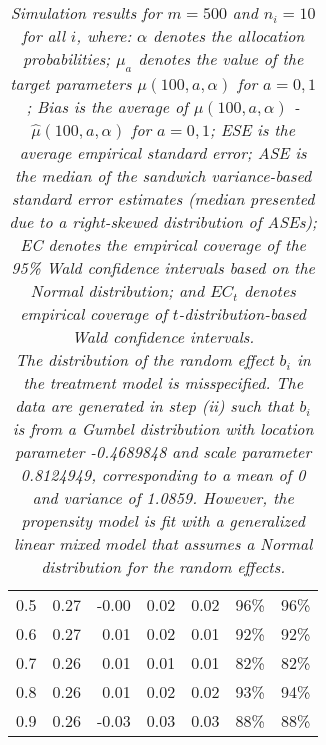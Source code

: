 \documentclass[12pt, letterpaper]{article}
\begin{document}
\begin{table}[ht!]
\begin{tabular}{rrrrrll}
  0.5 & 0.27 & -0.00 & 0.02 & 0.02 & 96\% & 96\% \\ 
  0.6 & 0.27 & 0.01 & 0.02 & 0.01 & 92\% & 92\% \\ 
  0.7 & 0.26 & 0.01 & 0.01 & 0.01 & 82\% & 82\% \\ 
  0.8 & 0.26 & 0.01 & 0.02 & 0.02 & 93\% & 94\% \\ 
  0.9 & 0.26 & -0.03 & 0.03 & 0.03 & 88\% & 88\% \\ 
   \hline
\end{tabular}
\egroup
\caption*{\textit{Simulation results for $m = 500$ and $n_i = 10$ for all $i$, where: $\alpha$ denotes the allocation probabilities; $\mu_a$ denotes the value of the target parameters $\mu(100, a, \alpha)$ for $a=0,1$; Bias is the average of $\mu(100, a, \alpha)$ - $\hat{\mu}(100, a, \alpha)$ for $a=0, 1$; ESE is the average empirical standard error; ASE is the median of the sandwich variance-based standard error estimates (median presented due to a right-skewed distribution of ASEs); EC denotes the empirical coverage of the 95\% Wald confidence intervals based on the Normal distribution; and $EC_t$ denotes empirical coverage of $t$-distribution-based Wald confidence intervals.} \\ 

\textit{The distribution of the random effect $b_i$ in the treatment model is misspecified. The data are generated in step (ii) such that $b_i$ is from a Gumbel distribution with location parameter -0.4689848 and scale parameter 0.8124949, corresponding to a mean of 0 and variance of 1.0859. However, the propensity model is fit with a generalized linear mixed model that assumes a Normal distribution for the random effects.}}
\end{table}

\clearpage 


\end{document}
